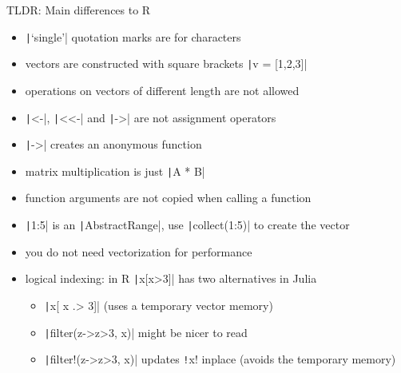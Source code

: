 \documentclass[aspectratio=169, 12pt]{beamer}
\begin{document}
    \begin{frame}[fragile]{TLDR: Main differences to R}
        \begin{itemize}
            \item \texttt|‘single’| quotation marks are for characters
            \item vectors are constructed with square brackets \texttt|v = [1,2,3]|
            \item operations on vectors of different length are not allowed
            \item \texttt|<-|, \texttt|<<-| and \texttt|->| are not assignment operators
            \item \texttt|->| creates an anonymous function
            \pause
            \item matrix multiplication is just \texttt|A * B|
            \item function arguments are not copied when calling a function
            \item \texttt|1:5| is an \texttt|AbstractRange|, use \texttt|collect(1:5)| to create the vector
            \pause
            \item you do not need vectorization for performance
            \item logical indexing: in R \texttt|x[x>3]| has two alternatives in Julia
            \begin{itemize}
                \item \texttt|x[ x .> 3]| (uses a temporary vector memory)
                \item \texttt|filter(z->z>3, x)| might be nicer to read
                \item \texttt|filter!(z->z>3, x)| updates \texttt!x! inplace (avoids the temporary memory)
            \end{itemize}
        \end{itemize}
    \end{frame}
\end{document}
